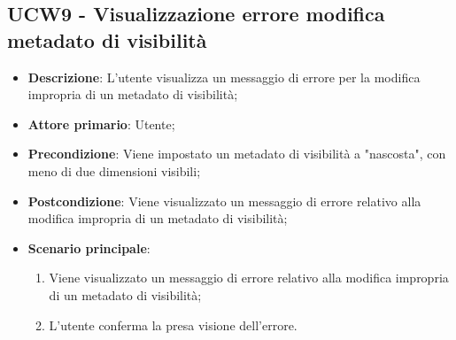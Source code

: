 \subsection{UCW9 - Visualizzazione errore modifica metadato di visibilità}
\label{sub:ucw9}

\begin{itemize}
    \item \textbf{Descrizione}: L'utente visualizza un messaggio di errore per la modifica impropria di un metadato di 
    visibilità;

    \item \textbf{Attore primario}: Utente;
    
    \item \textbf{Precondizione}:   Viene impostato un metadato di visibilità a "nascosta", con meno di due dimensioni 
    visibili;

    \item \textbf{Postcondizione}:   Viene visualizzato un messaggio di errore relativo alla modifica impropria di un 
    metadato di visibilità;

    \item \textbf{Scenario principale}:
    \begin{enumerate}
        \item Viene visualizzato un messaggio di errore relativo alla modifica impropria di un metadato di visibilità;
        \item L'utente conferma la presa visione dell'errore.
    \end{enumerate}
\end{itemize}